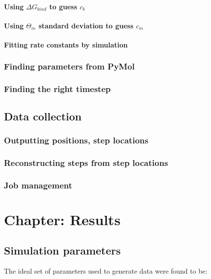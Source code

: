 \documentclass[10pt]{article} %
\begin{document}
\paragraph{Using $\Delta G_{bind}$ to guess $c_b$}
\paragraph{Using $\Theta_m$ standard deviation to guess $c_m$}
\paragraph{Fitting rate constants by simulation}

\subsubsection{Finding parameters from PyMol}

\subsubsection{Finding the right timestep}

\subsection{Data collection}

\subsubsection{Outputting positions, step locations}
\subsubsection{Reconstructing steps from step locations}
\subsubsection{Job management}

\section{Chapter: Results}

\subsection{Simulation parameters}
The ideal set of parameters used to generate data were found to be:
\end{document}
